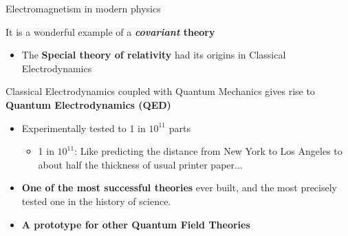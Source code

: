 \begin{frame}{Electromagnetism in modern physics}

It is a wonderful example of a {\bf {\em covariant} theory}
\begin{itemize}
  \item The {\bf Special theory of relativity} had its origins in Classical Electrodynamics
\end{itemize}

\vspace{0.2cm}

Classical Electrodynamics coupled with Quantum Mechanics gives rise to {\bf Quantum Electrodynamics (QED)}
\begin{itemize}
  \item Experimentally tested to 1 in $10^{11}$ parts
  \begin{itemize}
     \item 1 in $10^{11}$: Like predicting the distance from New York to Los Angeles to about half the thickness of usual printer paper...
  \end{itemize}
  \item {\bf One of the most successful theories} ever built, and the most precisely tested one in the history of science.
  \item {\bf A prototype for other Quantum Field Theories}
\end{itemize}

\end{frame}
